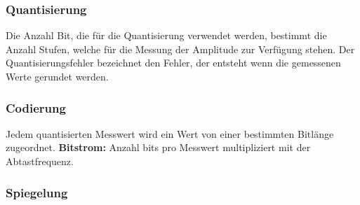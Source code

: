 \subsubsection{Quantisierung}
Die Anzahl Bit, die für die Quantisierung verwendet werden, bestimmt die Anzahl Stufen, welche für die Messung der Amplitude zur Verfügung stehen.
Der Quantisierungsfehler bezeichnet den Fehler, der entsteht wenn die gemessenen Werte gerundet werden.
\subsubsection{Codierung}
Jedem quantisierten Messwert wird ein Wert von einer bestimmten Bitlänge zugeordnet. \textbf{Bitstrom: } Anzahl bits pro Messwert multipliziert mit der Abtastfrequenz.

\subsubsection{Spiegelung}
